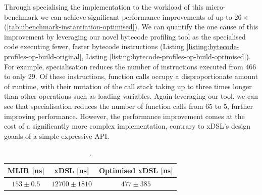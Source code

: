 Through specialising the implementation to the workload of this micro-benchmark we can achieve significant performance improvements of up to $26\times$ (\autoref{tab:ubenchmark-instantiation-optimised}).
We can quantify the one cause of this improvement by leveraging our novel bytecode profiling tool as the specialised code executing fewer, faster bytecode instructions (Listing \ref{listing:bytecode-profiles-op-build-original}, Listing \ref{listing:bytecode-profiles-op-build-optimised}).
For example, specialisation reduces the number of instructions executed from $466$ to only $29$. Of these instructions, function calls occupy a disproportionate amount of runtime, with their mutation of the call stack taking up to three times longer than other operations such as loading variables. Again leveraging our tool, we can see that specialisation reduces the number of function calls from $65$ to $5$, further improving performance.
However, the performance improvement comes at the cost of a significantly more complex implementation, contrary to xDSL's design goaals of a simple expressive API.


\begin{table}[H]
  \caption{.}
  \label{tab:ubenchmark-instantiation-optimised}
  \centering
  \begin{tabular}{ccc}
    \toprule
    \textbf{MLIR [ns]} & \textbf{xDSL [ns]} & \textbf{Optimised xDSL [ns]} \\
    \midrule
    $153 \pm 0.5$ & $12700 \pm 1810$ & $477 \pm 385$ \\
    \bottomrule
  \end{tabular}
\end{table}









